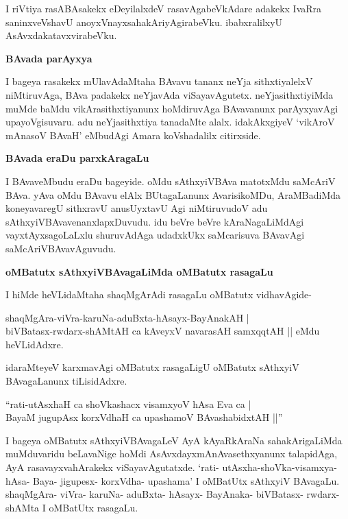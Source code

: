 I riVtiya rasABAsakekx eDeyilalxdeV rasavAgabeVkAdare adakekx IvaRra saninxveVshavU anoyxVnayxsahakAriyAgirabeVku. ibabxralilxyU AsAvxdakatavxvirabeVku.

{\bigskip
\noindent
{\large\bf BAvada parAyxya}}\label{page230}
\medskip

\noindent
I bageya rasakekx mUlavAdaMtaha BAvavu tananx neYja sithxtiyalelxV niMtiruvAga, BAva padakekx neYjavAda viSayavAgutetx. neYjasithxtiyiMda muMde baMdu vikArasithxtiyanunx hoMdiruvAga BAvavanunx parAyxyavAgi upayoVgisuvaru. adu neYjasithxtiya tanadaMte alalx. idakAkxgiyeV `vikAroV mAnasoV BAvaH'\label{230} eMbudAgi Amara koVshadalilx citirxside.

{\bigskip
\noindent
{\large\bf BAvada eraDu parxkAragaLu}}\label{page230a}
\medskip

\noindent
I BAvaveMbudu eraDu bageyide. oMdu sAthxyiVBAva matotxMdu saMcAriV BAva. yAva oMdu BAvavu elAlx BUtagaLanunx AvarisikoMDu, AraMBadiMda koneyavaregU sithxravU anusUyxtavU Agi niMtiruvudoV adu sAthxyiVBAvavenanxlapxDuvudu. idu beVre beVre kAraNagaLiMdAgi vayxtAyxsagoLaLxlu shuruvAdAga udadxkUkx saMcarisuva BAvavAgi saMcAriVBAvavAguvudu.

{\bigskip
\noindent
{\large\bf oMBatutx sAthxyiVBAvagaLiMda oMBatutx rasagaLu}}\label{page230b}
\medskip

\noindent
I hiMde heVLidaMtaha shaqMgArAdi rasagaLu oMBatutx vidhavAgide-

\begin{shloka}
shaqMgAra-viVra-karuNa-aduBxta-hAsayx-BayAnakAH |\\\label{230a}
biVBatasx-rwdarx-shAMtAH ca kAveyxV navarasAH samxqqtAH || eMdu heVLidAdxre.
\end{shloka}

idaraMteyeV karxmavAgi oMBatutx rasagaLigU oMBatutx sAthxyiV BAvagaLanunx tiLisidAdxre.

\begin{shloka}
``rati-utAsxhaH ca shoVkashacx visamxyoV hAsa Eva ca |\\\label{230b}
BayaM jugupAsx korxVdhaH ca upashamoV BAvashabidxtAH ||''
\end{shloka}

I bageya oMBatutx sAthxyiVBAvagaLeV AyA kAyaRkAraNa sahakArigaLiMda muMduvaridu beLavaNige hoMdi AsAvxdayxmAnAvasethxyanunx talapidAga, AyA rasavayxvahArakekx viSayavAgutatxde. `rati- utAsxha-shoVka-visamxya- hAsa- Baya- jigupesx- korxVdha- upashama' I oMBatUtx sAthxyiV BAvagaLu. shaqMgAra- viVra- karuNa- aduBxta- hAsayx- BayAnaka- biVBatasx- rwdarx- shAMta I oMBatUtx rasagaLu.

